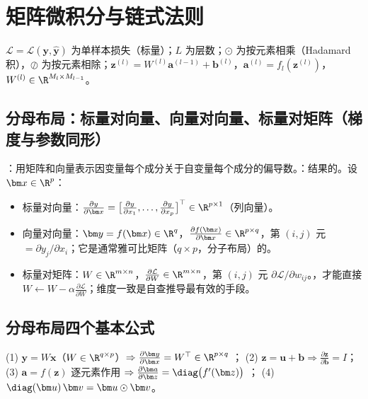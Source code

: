\section{矩阵微积分与链式法则}
\noindent{}\quad $\mathcal L=\mathcal L(\bm y,\hat{\bm y})$ 为单样本损失（标量）；$L$ 为层数；$\odot$ 为按元素相乘（Hadamard 积），$\oslash$ 为按元素相除；$\bm z^{(l)}=W^{(l)}\bm a^{(l-1)}+\bm b^{(l)}$，$\bm a^{(l)}=f_l(\bm z^{(l)})$，$W^{(l)}\in\R^{M_l\times M_{l-1}}$。

\subsection{分母布局：标量对向量、向量对向量、标量对矩阵（梯度与参数同形）}
：用矩阵和向量表示因变量每个成分关于自变量每个成分的偏导数。：结果的。设 $\bm x\in\R^p$：
\begin{itemize}
\item 标量对向量：$\frac{\partial y}{\partial\bm x}=\big[\frac{\partial y}{\partial x_1},\dots,\frac{\partial y}{\partial x_p}\big]^\top\in\R^{p\times1}$（列向量）。
\item 向量对向量：$\bm y=f(\bm x)\in\R^q$，$\frac{\partial f(\bm x)}{\partial\bm x}\in\R^{p\times q}$，第 $(i,j)$ 元 $=\partial y_j/\partial x_i$；它是通常雅可比矩阵（$q\times p$，分子布局）的。
\item 标量对矩阵：$W\in\R^{m\times n}$，$\frac{\partial\mathcal L}{\partial W}\in\R^{m\times n}$，第 $(i,j)$ 元 $\partial\mathcal L/\partial w_{ij}$。，才能直接 $W\leftarrow W-\alpha\frac{\partial\mathcal L}{\partial W}$；维度一致是自查推导最有效的手段。
\end{itemize}

\subsection{分母布局四个基本公式}
(1) $\bm y=W\bm x$（$W\in\R^{q\times p}$）$\Rightarrow\frac{\partial\bm y}{\partial\bm x}=W^\top\in\R^{p\times q}$ ；
(2) $\bm z=\bm u+\bm b\Rightarrow\frac{\partial\bm z}{\partial\bm b}=I$；
(3) $\bm a=f(\bm z)$ 逐元素作用 $\Rightarrow\frac{\partial\bm a}{\partial\bm z}=\diag\big(f'(\bm z)\big)$ ；
(4) $\diag(\bm u)\,\bm v=\bm u\odot\bm v$。

